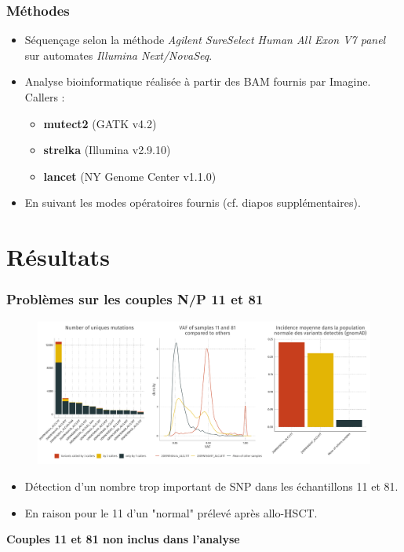 \documentclass[aspectratio=1610]{beamer}
\begin{document}
\begin{frame}
  \frametitle{ Méthodes}
  \begin{itemize}
    \item[]  Séquençage selon la méthode \textit{Agilent SureSelect Human All Exon V7 panel} sur automates \textit{Illumina Next/NovaSeq}.
    \vskip 0.2in
    \item[]  Analyse bioinformatique réalisée à partir des BAM fournis par Imagine.
    \vskip 0.1in
    Callers : 
    \vskip 0.05in
    \begin{itemize}
      \item \textbf{mutect2} (GATK v4.2)
      \item \textbf{strelka} (Illumina v2.9.10)
      \item \textbf{lancet} (NY Genome Center v1.1.0)
    \end{itemize}
    \vskip 0.05in
    \item[] En suivant les modes opératoires fournis (cf. diapos supplémentaires).
  \end{itemize}
\end{frame}


\section{ Résultats}

\begin{frame}
  \frametitle{ Problèmes sur les couples N/P 11 et 81}
  \begin{center}
    \begin{figure}
        \centering
      \includegraphics[width=\textwidth]{Images/Qual.pdf}
    \end{figure}
  \end{center}
  \begin{itemize}
    \item Détection d'un nombre trop important de SNP dans les échantillons 11 et 81.
    \item En raison pour le 11 d'un "normal" prélevé après allo-HSCT.
  \end{itemize}
  \textbf{
      Couples 11 et 81 non inclus dans l'analyse 
  }
\end{frame}
\end{document}
